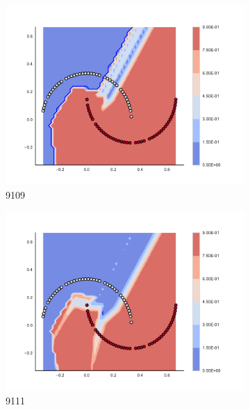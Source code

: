 \begin{figure}[h]
\begin{subfigure}[b]{0.09\textwidth}
    \includegraphics[clip, trim=2.35cm 1.75cm 4.5cm 0cm,width=\textwidth]{img/convergence/9109.pdf}
    \caption{9109}
    \label{fig:convergence_9109}
\end{subfigure}
%
\begin{subfigure}[b]{0.09\textwidth}
    \includegraphics[clip, trim=2.35cm 1.75cm 4.5cm 0cm,width=\textwidth]{img/convergence/9111.pdf}
    \caption{9111}
    \label{fig:convergence_9111}
\end{subfigure}
%
\begin{subfigure}[b]{0.09\textwidth}

\end{subfigure}
\end{figure}
